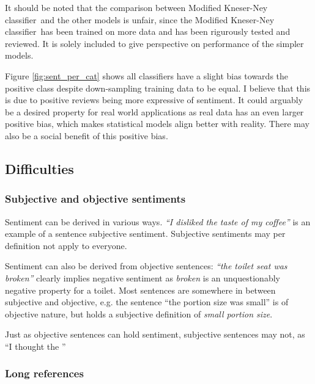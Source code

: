 \documentclass[a4paper,11pt]{kth-mag}
\newcommand{\ysc}{Modified Kneser-Ney classifier}
\begin{document}
It should be noted that the comparison between \ysc~and the other models is unfair, since the \ysc~has been trained on more data and has been rigurously tested and reviewed. It is solely included to give perspective on performance of the simpler models.

Figure \ref{fig:sent_per_cat} shows all classifiers have a slight bias towards the positive class despite down-sampling training data to be equal. I believe that this is due to positive reviews being more expressive of sentiment. It could arguably be a desired property for real world applications as real data has an even larger positive bias, which makes statistical models align better with reality. There may also be a social benefit of this positive bias.





\subsection{Difficulties}
\subsubsection{Subjective and objective sentiments}
Sentiment can be derived in various ways. \emph{``I disliked the taste of my coffee''} is an example of a sentence subjective sentiment. Subjective sentiments may per definition not apply to everyone.

Sentiment can also be derived from objective sentences: \emph{``the toilet seat was broken''} clearly implies negative sentiment as \emph{broken} is an unquestionably negative property for a toilet. Most sentences are somewhere in between subjective and objective, e.g. the sentence ``the portion size was small'' is of objective nature, but holds a subjective definition of \emph{small portion size}.

Just as objective sentences can hold sentiment, subjective sentences may not, as ``I thought the ''


\subsubsection{Long references}



\end{document}
